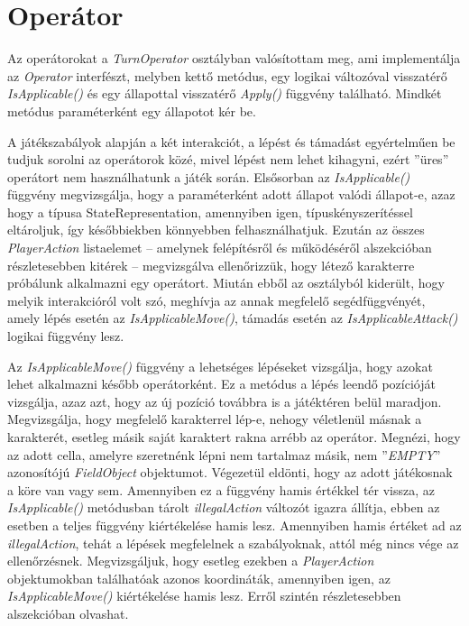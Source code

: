 \documentclass[
]{thesis-ekf}
\theoremstyle{definition}
\theoremstyle{remark}
\begin{document}
\section{Operátor} \label{operator}

Az operátorokat a \emph{TurnOperator} osztályban valósítottam meg, ami implementálja az \emph{Operator} interfészt, melyben kettő metódus, egy logikai változóval visszatérő \emph{IsApplicable()} és egy állapottal visszatérő \emph{Apply()} függvény található. Mindkét metódus paraméterként egy állapotot kér be.

A játékszabályok alapján a két interakciót, a lépést és támadást egyértelműen be tudjuk sorolni az operátorok közé, mivel lépést nem lehet kihagyni, ezért ''üres'' operátort nem használhatunk a játék során. Elsősorban az \emph{IsApplicable()} függvény megvizsgálja, hogy a paraméterként adott állapot valódi állapot-e, azaz hogy a típusa StateRepresentation, amennyiben igen, típuskényszerítéssel eltároljuk, így későbbiekben könnyebben felhasználhatjuk. Ezután az összes \emph{PlayerAction} listaelemet -- amelynek felépítésről és működéséről  alszekcióban részletesebben kitérek -- megvizsgálva ellenőrizzük, hogy létező karakterre próbálunk alkalmazni egy operátort. Miután ebből az osztályból kiderült, hogy melyik interakcióról volt szó, meghívja az annak megfelelő segédfüggvényét, amely lépés esetén az \emph{IsApplicableMove()}, támadás esetén az \emph{IsApplicableAttack()} logikai függvény lesz.

Az \emph{IsApplicableMove()} függvény a lehetséges lépéseket vizsgálja, hogy azokat lehet alkalmazni később operátorként. Ez a metódus a lépés leendő pozícióját vizsgálja, azaz azt, hogy az új pozíció továbbra is a játéktéren belül maradjon. Megvizsgálja, hogy megfelelő karakterrel lép-e, nehogy véletlenül másnak a karakterét, esetleg másik saját karaktert rakna arrébb az operátor. Megnézi, hogy az adott cella, amelyre szeretnénk lépni nem tartalmaz másik, nem ''\emph{EMPTY}'' azonosítójú \emph{FieldObject} objektumot. Végezetül eldönti, hogy az adott játékosnak a köre van vagy sem. Amennyiben ez a függvény hamis értékkel tér vissza, az \emph{IsApplicable()} metódusban tárolt \emph{illegalAction} változót igazra állítja, ebben az esetben a teljes függvény kiértékelése hamis lesz. Amennyiben hamis értéket ad az \emph{illegalAction}, tehát a lépések megfelelnek a szabályoknak, attól még nincs vége az ellenőrzésnek. Megvizsgáljuk, hogy esetleg ezekben a \emph{PlayerAction} objektumokban találhatóak azonos koordináták, amennyiben igen, az \emph{IsApplicableMove()} kiértékelése hamis lesz. Erről szintén részletesebben  alszekcióban olvashat.
\end{document}

